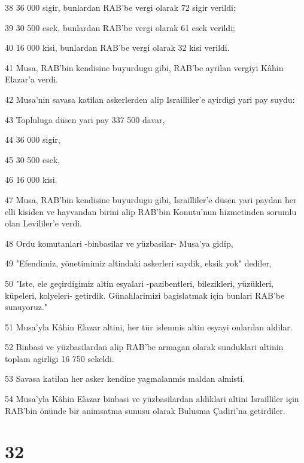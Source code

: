 \par 38 36 000 sigir, bunlardan RAB'be vergi olarak 72 sigir verildi;
\par 39 30 500 esek, bunlardan RAB'be vergi olarak 61 esek verildi;
\par 40 16 000 kisi, bunlardan RAB'be vergi olarak 32 kisi verildi.
\par 41 Musa, RAB'bin kendisine buyurdugu gibi, RAB'be ayrilan vergiyi Kâhin Elazar'a verdi.
\par 42 Musa'nin savasa katilan askerlerden alip Israilliler'e ayirdigi yari pay suydu:
\par 43 Topluluga düsen yari pay 337 500 davar,
\par 44 36 000 sigir,
\par 45 30 500 esek,
\par 46 16 000 kisi.
\par 47 Musa, RAB'bin kendisine buyurdugu gibi, Israilliler'e düsen yari paydan her elli kisiden ve hayvandan birini alip RAB'bin Konutu'nun hizmetinden sorumlu olan Levililer'e verdi.
\par 48 Ordu komutanlari -binbasilar ve yüzbasilar- Musa'ya gidip,
\par 49 "Efendimiz, yönetimimiz altindaki askerleri saydik, eksik yok" dediler,
\par 50 "Iste, ele geçirdigimiz altin esyalari -pazibentleri, bilezikleri, yüzükleri, küpeleri, kolyeleri- getirdik. Günahlarimizi bagislatmak için bunlari RAB'be sunuyoruz."
\par 51 Musa'yla Kâhin Elazar altini, her tür islenmis altin esyayi onlardan aldilar.
\par 52 Binbasi ve yüzbasilardan alip RAB'be armagan olarak sunduklari altinin toplam agirligi 16 750 sekeldi.
\par 53 Savasa katilan her asker kendine yagmalanmis maldan almisti.
\par 54 Musa'yla Kâhin Elazar binbasi ve yüzbasilardan aldiklari altini Israilliler için RAB'bin önünde bir animsatma sunusu olarak Bulusma Çadiri'na getirdiler.

\chapter{32}

